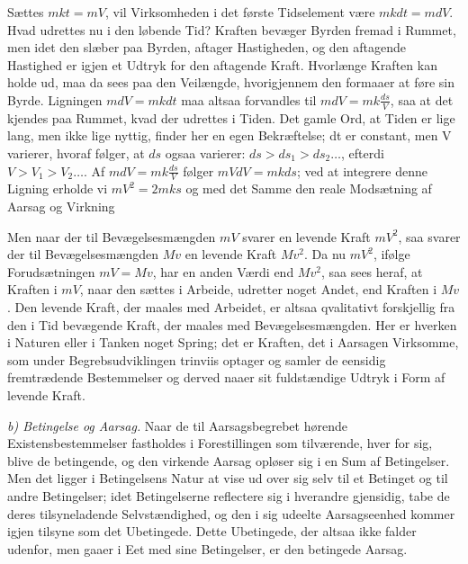 \documentclass[12pt,a4paper]{book}
\newcommand{\runin}[1]{\emph{#1}\hspace{0.4em}}
\begin{document}
Sættes $mkt = mV$, vil Virksomheden i det første Tidselement være
$mkdt = mdV$. Hvad udrettes nu i den løbende Tid? Kraften bevæger Byrden
fremad i Rummet, men idet den slæber paa Byrden, aftager Hastigheden, og
den aftagende Hastighed er igjen et Udtryk for den aftagende Kraft.
Hvorlænge Kraften kan holde ud, maa da sees paa den Veilængde,
hvorigjennem den formaaer at føre sin Byrde. Ligningen $mdV = mkdt$ maa
altsaa forvandles til $mdV = mk\frac{ds}{V}$,
saa at det kjendes paa Rummet, kvad der udrettes i Tiden. Det gamle Ord,
at Tiden er lige lang, men ikke lige nyttig, finder her en egen
Bekræftelse; dt er constant, men V varierer, hvoraf følger, at $ds$ ogsaa
varierer: $ds > ds_{1} > ds_{2} \ldots$, efterdi $V > V_{1} > V_{2}
\ldots$. Af $mdV = mk\frac{ds}{V}$ følger $mVdV = mkds$; ved at integrere
denne Ligning erholde vi $mV^{2} = 2mks$ og med det Samme den reale
Modsætning af Aarsag og Virkning

Men naar der til Bevægelsesmængden $mV$ svarer en levende Kraft $mV^{2}$,
saa svarer der til Bevægelsesmængden $Mv$ en levende Kraft $Mv^{2}$. Da
nu $mV^{2}$, ifølge Forudsætningen $mV = Mv$, har en anden Værdi end
$Mv^{2}$, saa sees heraf, at Kraften i $mV$, naar den sættes i Arbeide,
udretter noget Andet, end Kraften i $Mv$. Den levende Kraft, der maales
med Arbeidet, er altsaa qvalitativt forskjellig fra den i Tid bevægende
Kraft, der maales med Bevægelsesmængden. Her er hverken i Naturen eller i
Tanken noget Spring; det er Kraften, det i Aarsagen Virksomme, som under
Begrebsudviklingen trinviis optager og samler de eensidig fremtrædende
Bestemmelser og derved naaer sit fuldstændige Udtryk i Form af levende
Kraft.

\runin{b) Betingelse og Aarsag.} Naar de til Aarsagsbegrebet hørende
Existensbestemmelser fastholdes i Forestillingen som tilværende, hver for
sig, blive de betingende, og den virkende Aarsag opløser sig i en Sum af
Betingelser. Men det ligger i Betingelsens Natur at vise ud over sig selv
til et Betinget og til andre Betingelser; idet Betingelserne reflectere
sig i hverandre gjensidig, tabe de deres tilsyneladende Selvstændighed,
og den i sig udeelte Aarsagseenhed kommer igjen tilsyne som det
Ubetingede. Dette Ubetingede, der altsaa ikke falder udenfor, men gaaer i
Eet med sine Betingelser, er den betingede Aarsag.
\end{document}
